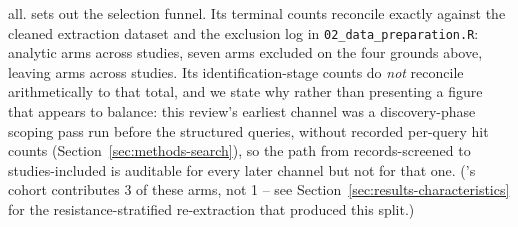 all.  sets out the selection funnel. Its terminal counts reconcile exactly against the cleaned extraction dataset and the exclusion log in \texttt{02\_data\_preparation.R}: \PrismaIncludedArms analytic arms across \PrismaIncludedStudies studies, seven arms excluded on the four grounds above, leaving \PrismaPooledArms arms across \PrismaPooledStudies studies. Its identification-stage counts do \emph{not} reconcile arithmetically to that total, and we state why rather than presenting a figure that appears to balance: this review's earliest channel was a discovery-phase scoping pass run before the structured queries, without recorded per-query hit counts (Section~\ref{sec:methods-search}), so the path from records-screened to studies-included is auditable for every later channel but not for that one. (\citeauthor{Pirnay2024_natmicrobiol}'s cohort contributes 3 of these \ArmsAnalysed arms, not 1 -- see Section~\ref{sec:results-characteristics} for the resistance-stratified re-extraction that produced this split.)

